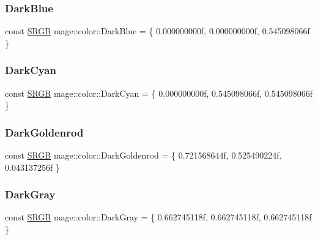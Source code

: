 \subsubsection{\texorpdfstring{Dark\+Blue}{DarkBlue}}
{\footnotesize\ttfamily const \hyperlink{structmage_1_1_s_r_g_b}{S\+R\+GB} mage\+::color\+::\+Dark\+Blue = \{ 0.\+000000000f, 0.\+000000000f, 0.\+545098066f \}}

\hypertarget{namespacemage_1_1color_a3e4eb4ccd282eeb2e7404ca03954a1a5}{}\label{namespacemage_1_1color_a3e4eb4ccd282eeb2e7404ca03954a1a5} 
\subsubsection{\texorpdfstring{Dark\+Cyan}{DarkCyan}}
{\footnotesize\ttfamily const \hyperlink{structmage_1_1_s_r_g_b}{S\+R\+GB} mage\+::color\+::\+Dark\+Cyan = \{ 0.\+000000000f, 0.\+545098066f, 0.\+545098066f \}}

\hypertarget{namespacemage_1_1color_a6065b0a2e7d3ac34d87fd4bddea4f034}{}\label{namespacemage_1_1color_a6065b0a2e7d3ac34d87fd4bddea4f034} 
\subsubsection{\texorpdfstring{Dark\+Goldenrod}{DarkGoldenrod}}
{\footnotesize\ttfamily const \hyperlink{structmage_1_1_s_r_g_b}{S\+R\+GB} mage\+::color\+::\+Dark\+Goldenrod = \{ 0.\+721568644f, 0.\+525490224f, 0.\+043137256f \}}

\hypertarget{namespacemage_1_1color_aa49fddaa3c5449f09c03175c05860f93}{}\label{namespacemage_1_1color_aa49fddaa3c5449f09c03175c05860f93} 
\subsubsection{\texorpdfstring{Dark\+Gray}{DarkGray}}
{\footnotesize\ttfamily const \hyperlink{structmage_1_1_s_r_g_b}{S\+R\+GB} mage\+::color\+::\+Dark\+Gray = \{ 0.\+662745118f, 0.\+662745118f, 0.\+662745118f \}}

\hypertarget{namespacemage_1_1color_a2fd0bacaaa0a787a63e57ee2fa2c36d7}{}\label{namespacemage_1_1color_a2fd0bacaaa0a787a63e57ee2fa2c36d7} 
